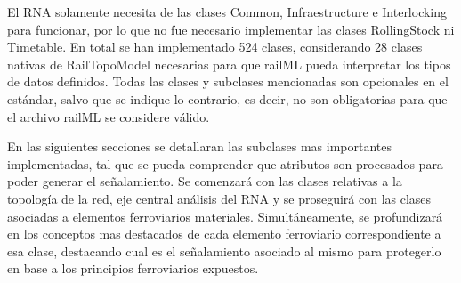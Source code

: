     El RNA solamente necesita de las clases Common, Infraestructure e Interlocking para funcionar, por lo que no fue necesario implementar las clases RollingStock ni Timetable. En total se han implementado 524 clases, considerando 28 clases nativas de RailTopoModel necesarias para que railML pueda interpretar los tipos de datos definidos. Todas las clases y subclases mencionadas son opcionales en el estándar, salvo que se indique lo contrario, es decir, no son obligatorias para que el archivo railML se considere válido.

    En las siguientes secciones se detallaran las subclases mas importantes implementadas, tal que se pueda comprender que atributos son procesados para poder generar el señalamiento. Se comenzará con las clases relativas a la topología de la red, eje central análisis del RNA y se proseguirá con las clases asociadas a elementos ferroviarios materiales. Simultáneamente, se profundizará en los conceptos mas destacados de cada elemento ferroviario correspondiente a esa clase, destacando cual es el señalamiento asociado al mismo para protegerlo en base a los principios ferroviarios expuestos.

    
    

    
    
    
    
    
    
    
    
    
    
    
    